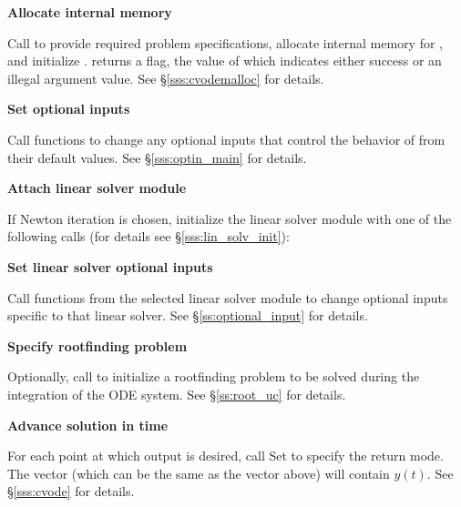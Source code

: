 \begin{Steps}
\item\label{i:cvode_malloc} 
  {\bf Allocate internal memory}

  Call  
  to provide required problem specifications,
  allocate internal memory for {\cvodes}, 
  and initialize {\cvodes}.
   returns a flag, the value of which indicates either success or an illegal
  argument value.  See \S\ref{sss:cvodemalloc} for details.
  
\item
  {\bf Set optional inputs}

  Call  functions to change any
  optional inputs that control the behavior of {\cvodes} from their default values.
  See \S\ref{sss:optin_main} for details.

\item\label{i:lin_solver} 
  {\bf Attach linear solver module}

  If Newton iteration is chosen, initialize the linear solver module
  with one of the following calls (for details see \S\ref{sss:lin_solv_init}):

  {\s} 

  {\s} 


  
  
  
\item
  {\bf Set linear solver optional inputs}

  Call  functions from the selected linear solver module to
  change optional inputs specific to that linear solver.
  See \S\ref{ss:optional_input} for details.

\item
  {\bf Specify rootfinding problem}

  Optionally, call  to initialize a rootfinding problem
  to be solved during the integration of the ODE system.
  See \S\ref{ss:root_uc} for details.

\item
  {\bf Advance solution in time}

  For each point at which output is desired, call
  Set  to specify the return mode.
  The vector  (which can be the same as
  the vector  above) will contain $y(t)$.
  See \S\ref{sss:cvode} for details.
  

\end{Steps}
